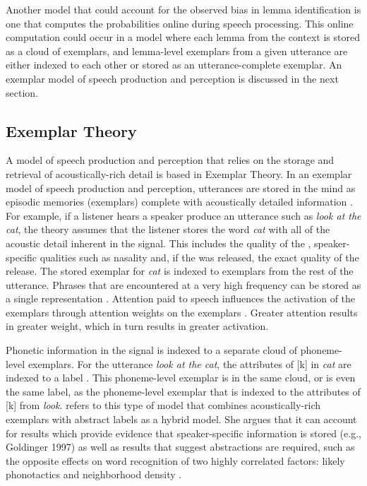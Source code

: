 Another model that could account for the observed bias in lemma identification is one that computes the probabilities online during speech processing.  This online computation could occur in a model where each lemma from the context is stored as a cloud of exemplars, and lemma-level exemplars from a given utterance are either indexed to each other or stored as an utterance-complete exemplar.  An exemplar model of speech production and perception is discussed in the next section.


\subsection{Exemplar Theory}\label{exemplar}

A model of speech production and perception that relies on the storage and retrieval of acoustically-rich detail is based in Exemplar Theory.  In an exemplar model of speech production and perception, utterances are stored in the mind as episodic memories (exemplars) \citep{pisoni1997} complete with acoustically detailed information \citep{goldinger1997,pierrehumbert2001,pierrehumbert2002}.  For example, if a listener hears a speaker produce an utterance such as \textit{look at the cat}, the theo\-ry assumes that the listener stores the word \textit{cat} with all of the acoustic detail inherent in the signal.  This includes the quality of the , speaker-specific quali\-ties such as nasality and, if the  was released, the exact quality of the release.  The stored exemplar for \textit{cat} is indexed to exemplars from the rest of the utte\-rance.  Phrases that are encountered at a very high frequency can be stored as a single representation \citep{bybee2006}. Attention paid to speech influences the activation of the exemplars through attention weights on the exemplars \citep{nosofsky1986}.  Greater attention results in greater weight, which in turn results in greater activation.  

Phonetic information in the signal is indexed to a separate cloud of phoneme-level exemplars.  For the utterance \textit{look at the cat}, the attributes of [k] in \textit{cat} are indexed to a label .  This phoneme-level exemplar is in the same cloud, or is even the same label, as the phoneme-level exemplar  that is indexed to the attributes of [k] from \textit{look}.  \citet{pierrehumbert2006} refers to this type of model that combines acoustically-rich exemplars with abstract labels as a hybrid model.  She argues that it can account for results which provide evidence that speaker-specific information is stored (e.g., Goldinger 1997) as well as results that suggest abstractions are required, such as the opposite effects on word recognition of two highly correlated factors: likely phonotactics and neighborhood density \citep{vitevitchluce1999}.  

